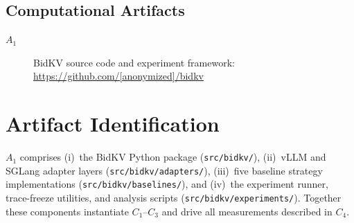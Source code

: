 \documentclass[conference]{IEEEtran}
\begin{document}
\subsection{Computational Artifacts}

\begin{description}
\item[$A_1$] BidKV source code and experiment framework:\\
  \url{https://github.com/[anonymized]/bidkv}
\end{description}

\begin{center}
\end{center}


\section{Artifact Identification}

\newartifact

\artrel

$A_1$ comprises (i)~the BidKV Python package
(\texttt{src/bidkv/}), (ii)~vLLM and SGLang adapter layers
(\texttt{src/bidkv/adapters/}), (iii)~five baseline strategy
implementations (\texttt{src/bidkv/baselines/}), and (iv)~the
experiment runner, trace-freeze utilities, and analysis scripts
(\texttt{src/bidkv/experiments/}).
Together these components instantiate $C_1$--$C_3$ and drive all
measurements described in $C_4$.
\end{document}
